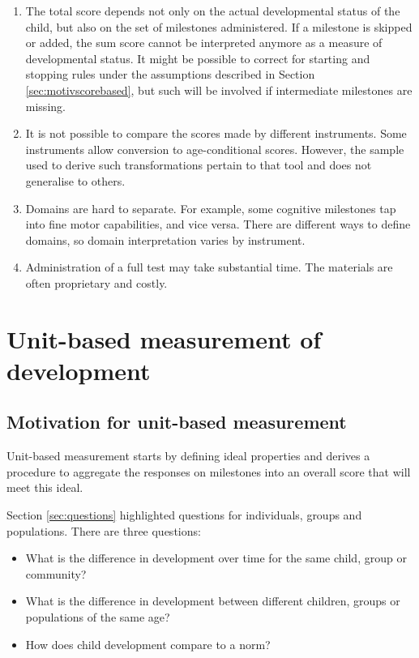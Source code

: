 \documentclass[
]{book}
\providecommand{\tightlist}{%
  \setlength{\itemsep}{0pt}\setlength{\parskip}{0pt}}
\begin{document}
\begin{enumerate}
\def\labelenumi{\arabic{enumi}.}
\tightlist
\item
  The total score depends not only on the actual developmental status of the child, but also on the set of milestones administered. If a milestone is skipped or added, the sum score cannot be interpreted anymore as a measure of developmental status. It might be possible to correct for starting and stopping rules under the assumptions described in Section \ref{sec:motivscorebased}, but such will be involved if intermediate milestones are missing.
\item
  It is not possible to compare the scores made by different instruments. Some instruments allow conversion to age-conditional scores. However, the sample used to derive such transformations pertain to that tool and does not generalise to others.
\item
  Domains are hard to separate. For example, some cognitive milestones tap into fine motor capabilities, and vice versa. There are different ways to define domains, so domain interpretation varies by instrument.
\item
  Administration of a full test may take substantial time. The materials are often proprietary and costly.
\end{enumerate}

\hypertarget{sec:unitbased}{%
\section{Unit-based measurement of development}\label{sec:unitbased}}

\hypertarget{sec:motivationunit}{%
\subsection{Motivation for unit-based measurement}\label{sec:motivationunit}}

Unit-based measurement starts by defining ideal properties and derives a procedure to aggregate the responses on milestones into an overall score that will meet this ideal.

Section \ref{sec:questions} highlighted questions for individuals, groups and populations. There are three questions:

\begin{itemize}
\tightlist
\item
  What is the difference in development over time for the same child, group or community?
\item
  What is the difference in development between different children, groups or populations of the same age?
\item
  How does child development compare to a norm?
\end{itemize}
\end{document}
